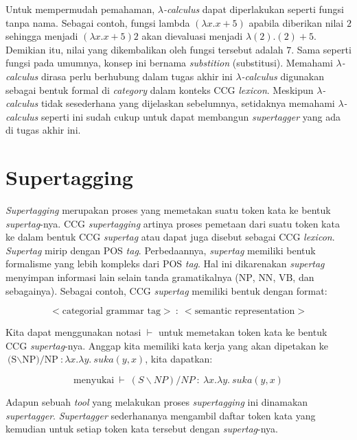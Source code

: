 Untuk mempermudah pemahaman, {$\lambda$}\textit{-calculus} dapat diperlakukan seperti fungsi tanpa
nama. Sebagai contoh, fungsi lambda $({\lambda}x. x + 5)$ apabila diberikan nilai $2$ sehingga
menjadi $({\lambda}x. x + 5) 2$ akan dievaluasi menjadi ${\lambda}(2). (2) + 5$.
Demikian itu, nilai yang dikembalikan oleh fungsi tersebut adalah $7$.
Sama seperti fungsi pada umumnya, konsep ini bernama \textit{substition} (substitusi).
Memahami {$\lambda$}\textit{-calculus} dirasa perlu berhubung dalam tugas akhir ini
{$\lambda$}\textit{-calculus} digunakan sebagai bentuk formal di \textit{category}
dalam konteks CCG \textit{lexicon}. Meskipun {$\lambda$}\textit{-calculus} tidak sesederhana
yang dijelaskan sebelumnya, setidaknya memahami {$\lambda$}\textit{-calculus} seperti ini
sudah cukup untuk dapat membangun \textit{supertagger} yang ada di tugas akhir ini.


\section{Supertagging}
\textit{Supertagging} merupakan proses yang memetakan suatu token kata ke bentuk
\textit{supertag}-nya. CCG \textit{supertagging} artinya proses pemetaan dari suatu token
kata ke dalam bentuk CCG \textit{supertag} atau dapat juga disebut sebagai CCG \textit{lexicon}.
\textit{Supertag} mirip dengan POS \textit{tag}.
Perbedaannya, \textit{supertag} memiliki bentuk formalisme yang lebih kompleks dari POS
\textit{tag}.
Hal ini dikarenakan \textit{supertag} menyimpan informasi lain selain tanda gramatikalnya
($\text{NP}$, $\text{NN}$, $\text{VB}$, dan sebagainya).
Sebagai contoh, CCG \textit{supertag} memiliki bentuk dengan format:

\begin{equation*}
<\text{categorial\ grammar\ tag}>\ :\ <\text{semantic\ representation}>
\end{equation*}

Kita dapat menggunakan notasi $\vdash$ untuk memetakan token kata ke bentuk CCG
\textit{supertag}-nya.
Anggap kita memiliki kata kerja  yang akan dipetakan ke
$\text{(S{$\backslash$}NP)/NP}: \lambda x.\lambda y.\ suka(y, x)$, kita dapatkan:

\begin{equation*}
  \text{menyukai}\ \vdash\ (S{\backslash}NP)/NP\ :\ \lambda x.\lambda y.\ suka(y, x)
\end{equation*}

Adapun sebuah \textit{tool} yang melakukan proses \textit{supertagging} ini dinamakan
\textit{supertagger}.
\textit{Supertagger} sederhananya mengambil daftar token kata yang kemudian untuk setiap
token kata tersebut  dengan \textit{supertag}-nya.


